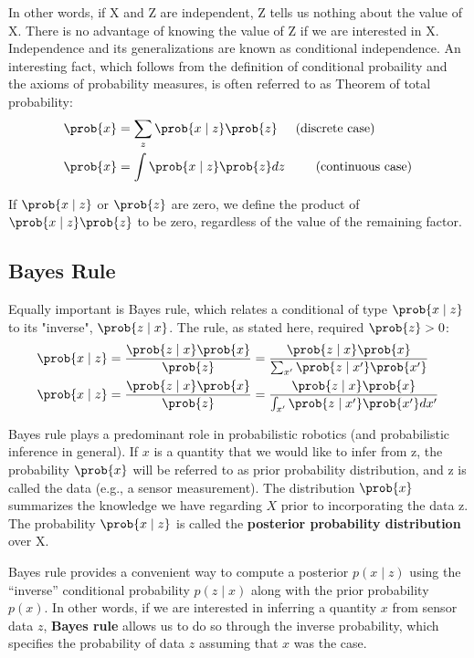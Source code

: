 In other words, if X and Z are independent, Z tells us nothing about the value of X. There is no advantage of knowing the value of Z if we are interested in X.
Independence and its generalizations are known as conditional independence.
An interesting fact, which follows from the definition of conditional probaility and the axioms of probability measures, is often referred to as Theorem of total probability:
\begin{align}
  \prob{x} &= \sum_{z}{\prob{x \mid z}\prob{z}}  \hspace{5mm}  \text{(discrete case)}\\
  \prob{x} &= \int{\prob{x \mid z}\prob{z} dz} \hspace{8.5mm} \text{(continuous case)}
\end{align}

If $\prob{x \mid z}$ or $\prob{z}$ are zero, we define the product of $\prob{x \mid z}\prob{z}$ to be zero, regardless of the value of the remaining factor.

\subsection{Bayes Rule}
Equally important is Bayes rule, which relates a conditional of type $\prob{x \mid z}$ to its "inverse", $\prob{z \mid x}$.
The rule, as stated here, required $\prob{z}>0$:
\begin{align}
  \prob{x \mid z} &= \frac{\prob{z \mid x}\prob{x}}{\prob{z}} = \frac{\prob{z \mid x}\prob{x}}{\sum_{x'}{\prob{z \mid x'}\prob{x'}}} \\
  \prob{x \mid z} &= \frac{\prob{z \mid x}\prob{x}}{\prob{z}} = \frac{\prob{z \mid x}\prob{x}}{\int_{x'}{\prob{z \mid x'}\prob{x'}dx'}}
\end{align}

Bayes rule plays a predominant role in probabilistic robotics (and probabilistic inference in general). If $x$ is a quantity that we would like to infer from z, the probability $\prob{x}$ will be referred to as prior probability distribution, and z is called the data (e.g., a sensor measurement).
The distribution $\prob{x}$ summarizes the knowledge we have regarding $X$ prior to incorporating the data z. The probability $\prob{x \mid z}$ is called the \textbf{posterior probability distribution} over X.

\vspace{2mm}
Bayes rule provides a convenient way to compute a posterior $p(x \mid z)$ using the “inverse” conditional probability $p(z \mid x)$ along with the prior probability $p(x)$.
In other words, if we are interested in inferring a quantity $x$ from sensor data $z$, \textbf{Bayes rule} allows us to do so through the inverse probability, which specifies the probability of data $z$ assuming that $x$ was the case.

